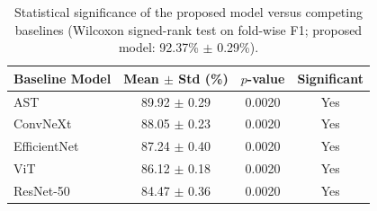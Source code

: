 \begin{table}[htbp]
\centering
\caption{Statistical significance of the proposed model versus competing baselines (Wilcoxon signed-rank test on fold-wise F1; proposed model: 92.37\% $\pm$ 0.29\%).}
\label{tab:wilcoxon}
\begin{tabular}{lccc}
\hline
Baseline Model & Mean $\pm$ Std (\%) & $p$-value & Significant \\
\hline
AST & 89.92 $\pm$ 0.29 & 0.0020 & Yes \\
ConvNeXt & 88.05 $\pm$ 0.23 & 0.0020 & Yes \\
EfficientNet & 87.24 $\pm$ 0.40 & 0.0020 & Yes \\
ViT & 86.12 $\pm$ 0.18 & 0.0020 & Yes \\
ResNet-50 & 84.47 $\pm$ 0.36 & 0.0020 & Yes \\
\hline
\end{tabular}
\end{table}
